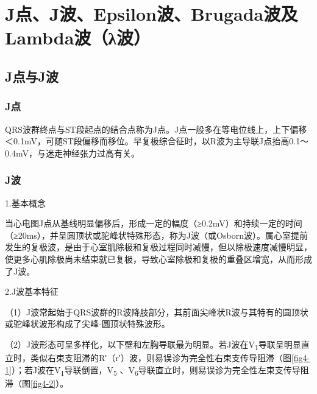 \protect\hypertarget{text00010.html}{}{}

\protect\hypertarget{text00010.htmlux5cux23chapter10}{}{}

\chapter{J点、J波、Epsilon波、Brugada波及Lambda波（λ波）}

\protect\hypertarget{text00010.htmlux5cux23subid66}{}{}

\section{J点与J波}

\protect\hypertarget{text00010.htmlux5cux23subid67}{}{}

\subsection{J点}

QRS波群终点与ST段起点的结合点称为J点。J点一般多在等电位线上，上下偏移＜0.1mV，可随ST段偏移而移位。早复极综合征时，以R波为主导联J点抬高0.1～0.4mV，与迷走神经张力过高有关。

\protect\hypertarget{text00010.htmlux5cux23subid68}{}{}

\subsection{J波}

1.基本概念

当心电图J点从基线明显偏移后，形成一定的幅度（≥0.2mV）和持续一定的时间（≥20ms），并呈圆顶状或驼峰状特殊形态，称为J波（或Osborn波）。属心室提前发生的复极波，是由于心室肌除极和复极过程同时减慢，但以除极速度减慢明显，使更多心肌除极尚未结束就已复极，导致心室除极和复极的重叠区增宽，从而形成了J波。

2.J波基本特征

（1）J波常起始于QRS波群的R波降肢部分，其前面尖峰状R波与其特有的圆顶状或驼峰状波形构成了尖峰-圆顶状特殊波形。

（2）J波形态可呈多样化，以下壁和左胸导联最为明显。若J波在V\textsubscript{1}导联呈明显直立时，类似右束支阻滞的R′（r′）波，则易误诊为完全性右束支传导阻滞（图\ref{fig4-1}）；若J波在V\textsubscript{1}导联倒置，V\textsubscript{5} 、V\textsubscript{6}导联直立时，则易误诊为完全性左束支传导阻滞（图\ref{fig4-2}）。

